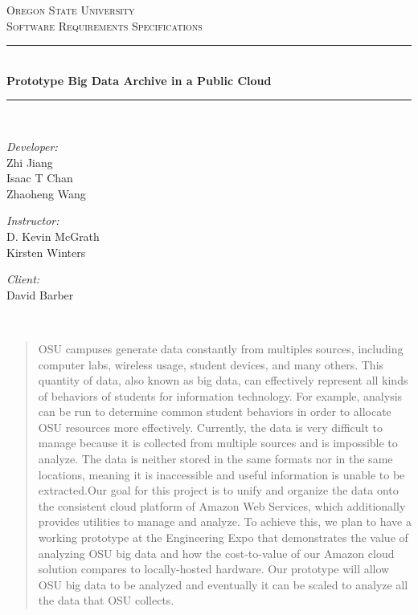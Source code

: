 \documentclass[letterpaper,10pt]{article}
\date{}
\begin{document}
    \begin{titlepage}
    \newcommand{\HRule}{\rule{\linewidth}{0.5mm}}
    \center 
    \textsc{Oregon State University}\\[1.5cm] 
    \textsc{Software Requirements Specifications}\\[0.5cm] 
    \HRule \\[0.4cm]
    { \huge \bfseries Prototype Big Data Archive in a Public Cloud}\\[0.4cm] %
    \HRule \\[1.5cm]
    \begin{minipage}{0.4\textwidth}
        \begin{flushleft} \large
        \emph{Developer:}\\
        Zhi Jiang\\
        Isaac T Chan\\
        Zhaoheng Wang
        \end{flushleft}
    \end{minipage}
    \begin{minipage}{0.4\textwidth}
        \begin{flushright} \large
        \emph{Instructor:} \\
        D. Kevin McGrath\\
    Kirsten Winters
        \end{flushright}
        \begin{flushright} \large
        \emph{Client:} \\
        David Barber
        \end{flushright}
    \end{minipage}\\[2cm]

  \begin{abstract}
    OSU campuses generate data constantly from multiples sources, including computer labs, wireless usage, student devices, and many others. This quantity of data, also known as big data, can effectively represent all kinds of behaviors of students for information technology. For example, analysis can be run to determine common student behaviors in order to allocate OSU resources more effectively. Currently, the data is very difficult to manage because it is collected from multiple sources and is impossible to analyze. The data is neither stored in the same formats nor in the same locations, meaning it is inaccessible and useful information is unable to be extracted.Our goal for this project is to unify and organize the data onto the consistent cloud platform of Amazon Web Services, which additionally provides utilities to manage and analyze. To achieve this, we plan to have a working prototype at the Engineering Expo that demonstrates the value of analyzing OSU big data and how the cost-to-value of our Amazon cloud solution compares to locally-hosted hardware. Our prototype will allow OSU big data to be analyzed and eventually it can be scaled to analyze all the data that OSU collects.
    \end{abstract}
    \vfill %
    \end{titlepage}
\end{document}
